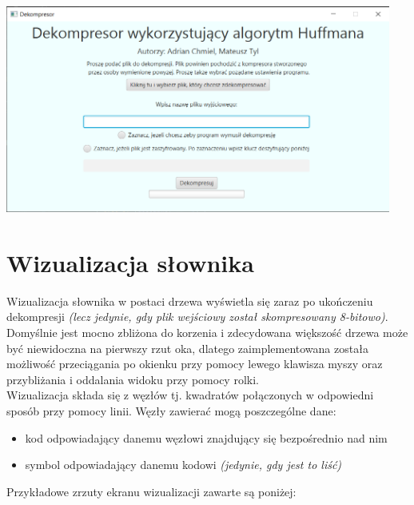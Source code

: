 \documentclass[]{article}
\begin{document}
\begin{center}
\includegraphics[width=0.95\textwidth]{dekompGUI.png}
\end{center}

\section{Wizualizacja słownika}\label{header-n233}
Wizualizacja słownika w postaci drzewa wyświetla się zaraz po ukończeniu dekompresji \textit{(lecz jedynie, gdy plik wejściowy został skompresowany 8-bitowo)}. Domyślnie jest mocno zbliżona do korzenia i zdecydowana większość drzewa może być niewidoczna na pierwszy rzut oka, dlatego zaimplementowana została możliwość przeciągania po okienku przy pomocy lewego klawisza myszy oraz przybliżania i oddalania widoku przy pomocy rolki.\\
Wizualizacja składa się z węzłów tj. kwadratów połączonych w odpowiedni sposób przy pomocy linii. Węzły zawierać mogą poszczególne dane:
\begin{itemize}
\item
kod odpowiadający danemu węzłowi znajdujący się bezpośrednio nad nim
\item
symbol odpowiadający danemu kodowi \textit{(jedynie, gdy jest to liść)}
\end{itemize}
Przykładowe zrzuty ekranu wizualizacji zawarte są poniżej:
\end{document}
